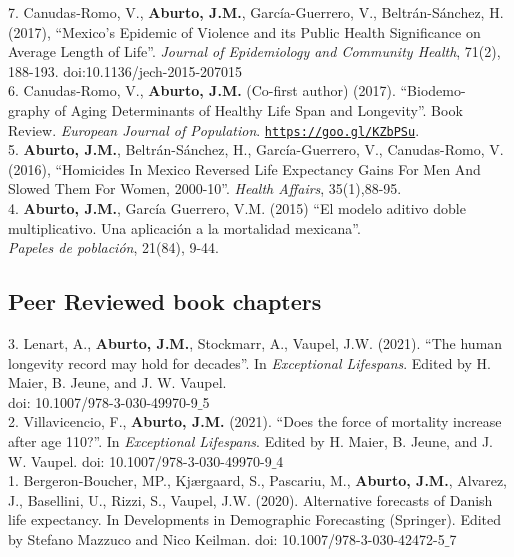 \documentclass[12pt]{article}
\providecommand*\url[1]{\href{#1}{#1}}
\renewcommand*\url[1]{\href{#1}{\texttt{#1}}}
\begin{document}
7. Canudas-Romo, V.,  \textbf{Aburto, J.M.}, Garc\'ia-Guerrero, V., Beltr\'an-S\'anchez, H. (2017),  ``Mexico's Epidemic of Violence and its Public Health Significance on Average Length of Life''. \emph{Journal of Epidemiology and Community Health}, 71(2), 188-193. doi:10.1136/jech-2015-207015 \\ 
  
6. Canudas-Romo, V.,  \textbf{Aburto, J.M.} (Co-first author) (2017). ``Biodemo- \\ graphy of Aging Determinants of Healthy Life Span and Longevity''. Book Review. \emph{European Journal of Population}. \url{https://goo.gl/KZbPSu}. \\ 
	 
5. \textbf{Aburto, J.M.}, Beltr\'an-S\'anchez, H., Garc\'ia-Guerrero, V., Canudas-Romo, V. (2016), ``Homicides In Mexico Reversed Life Expectancy Gains For Men And Slowed Them For Women, 2000-10''. \emph{Health Affairs}, 35(1),88-95. \\ 
		     
4. \textbf{Aburto, J.M.}, Garc\'ia Guerrero, V.M. (2015) ``El modelo aditivo doble multiplicativo. Una aplicaci\'on a la mortalidad mexicana''.\\  \emph{Papeles de poblaci\'on}, 21(84), 9-44. \\
		  
\subsection*{Peer Reviewed book chapters}

3. Lenart, A., \textbf{Aburto, J.M.}, Stockmarr, A., Vaupel, J.W. (2021). ``The human longevity record may hold for decades''. In \emph{Exceptional Lifespans}. Edited by H. Maier, B. Jeune, and J. W. Vaupel. \\
doi: 10.1007/978-3-030-49970-9$\_$5 \\ 


2. Villavicencio, F., \textbf{Aburto, J.M.} (2021). ``Does the force of mortality increase after age 110?''. In \emph{Exceptional Lifespans}. Edited by H. Maier, B. Jeune, and J. W. Vaupel. doi: 10.1007/978-3-030-49970-9$\_$4\\


1. Bergeron-Boucher, MP., Kj{\ae}rgaard, S.,  Pascariu, M., \textbf{Aburto, J.M.},  Alvarez, J., Basellini, U.,  Rizzi, S., Vaupel, J.W. (2020). Alternative forecasts of Danish life expectancy. In Developments in Demographic Forecasting (Springer). Edited by Stefano Mazzuco and Nico Keilman. doi: 10.1007/978-3-030-42472-5$\_$7\\
		  		  
\end{document}
